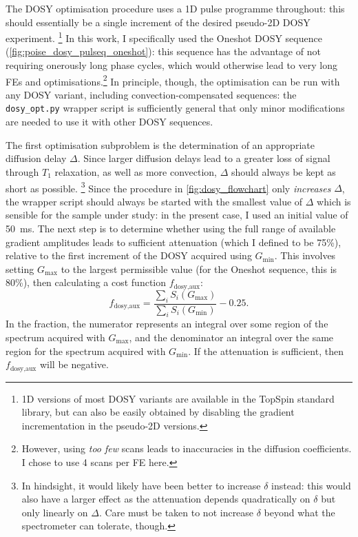 The DOSY optimisation procedure uses a 1D pulse programme throughout: this should essentially be a single increment of the desired pseudo-2D DOSY experiment.%
\footnote{1D versions of most DOSY variants are available in the TopSpin standard library, but can also be easily obtained by disabling the gradient incrementation in the pseudo-2D versions.}
In this work, I specifically used the Oneshot DOSY sequence\autocite{Pelta2002MRC} (\cref{fig:poise_dosy_pulseq_oneshot}): this sequence has the advantage of not requiring onerously long phase cycles, which would otherwise lead to very long FEs and optimisations.\footnote{However, using \textit{too few} scans leads to inaccuracies in the diffusion coefficients.\autocite{Pelta2002MRC} I chose to use 4 scans per FE here.}
In principle, though, the optimisation can be run with any DOSY variant, including convection-compensated sequences\autocite{Jerschow1997JMR,Sorland2000JMR,Nilsson2005JMR}: the \texttt{dosy\_opt.py} wrapper script is sufficiently general that only minor modifications are needed to use it with other DOSY sequences.

The first optimisation subproblem is the determination of an appropriate diffusion delay $\Delta$.
Since larger diffusion delays lead to a greater loss of signal through $T_1$ relaxation, as well as more convection\autocite{Swan2015JMR}, $\Delta$ should always be kept as short as possible.%
\footnote{In hindsight, it would likely have been better to increase $\delta$ instead: this would also have a larger effect as the attenuation depends quadratically on $\delta$ but only linearly on $\Delta$. Care must be taken to not increase $\delta$ beyond what the spectrometer can tolerate, though.}
Since the procedure in \cref{fig:dosy_flowchart} only \textit{increases} $\Delta$, the wrapper script should always be started with the smallest value of $\Delta$ which is sensible for the sample under study: in the present case, I used an initial value of \qty{50}{\ms}.
The next step is to determine whether using the full range of available gradient amplitudes leads to sufficient attenuation (which I defined to be 75\%), relative to the first increment of the DOSY acquired using $G_\text{min}$.
This involves setting $G_\text{max}$ to the largest permissible value (for the Oneshot sequence, this is 80\%), then calculating a cost function $f_\text{dosy,aux}$:
\begin{equation}
    \label{eq:dosy_aux_cf}
    f_\text{dosy,aux} = \frac{\sum_i S_i(G_\text{max})}{\sum_i S_i(G_\text{min})} - 0.25.
\end{equation}
In the fraction, the numerator represents an integral over some region of the spectrum acquired with $G_\text{max}$, and the denominator an integral over the same region for the spectrum acquired with $G_\text{min}$.
If the attenuation is sufficient, then $f_\text{dosy,aux}$ will be negative.

